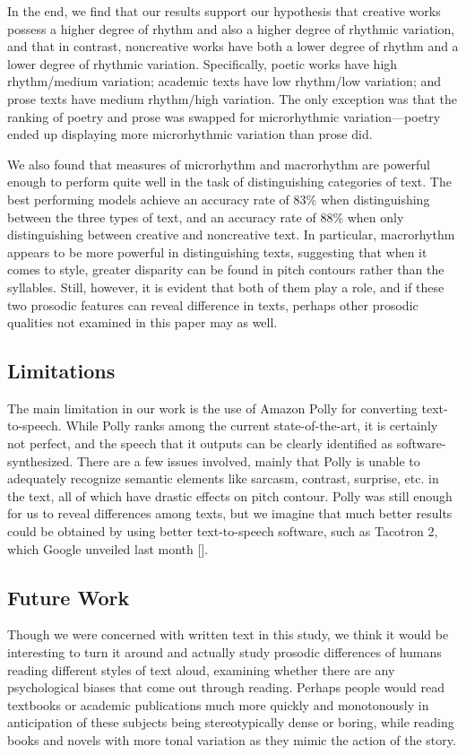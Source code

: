 \documentclass[pageno]{jpaper}
\begin{document}
	In the end, we find that our results support our hypothesis that creative works possess a higher degree of rhythm and also a higher degree of rhythmic variation, and that in contrast, noncreative works have both a lower degree of rhythm and a lower degree of rhythmic variation. Specifically, poetic works have high rhythm/medium variation; academic texts have low rhythm/low variation; and prose texts have medium rhythm/high variation. The only exception was that the ranking of poetry and prose was swapped for microrhythmic variation---poetry ended up displaying more microrhythmic variation than prose did.
	
	We also found that measures of microrhythm and macrorhythm are powerful enough to perform quite well in the task of distinguishing categories of text. The best performing models achieve an accuracy rate of 83\% when distinguishing between the three types of text, and an accuracy rate of 88\% when only distinguishing between creative and noncreative text. In particular, macrorhythm appears to be more powerful in distinguishing texts, suggesting that when it comes to style, greater disparity can be found in pitch contours rather than the syllables. Still, however, it is evident that both of them play a role, and if these two prosodic features can reveal difference in texts, perhaps other prosodic qualities not examined in this paper may as well.
\subsection{Limitations}
The main limitation in our work is the use of Amazon Polly for converting text-to-speech. While Polly ranks among the current state-of-the-art, it is certainly not perfect, and the speech that it outputs can be clearly identified as software-synthesized. There are a few issues involved, mainly that Polly is unable to adequately recognize semantic elements like sarcasm, contrast, surprise, etc. in the text, all of which have drastic effects on pitch contour. Polly was still enough for us to reveal differences among texts, but we imagine that much better results could be obtained by using better text-to-speech software, such as Tacotron 2, which Google unveiled last month [].
\subsection{Future Work}
Though we were concerned with written text in this study, we think it would be interesting to turn it around and actually study prosodic differences of humans reading different styles of text aloud, examining whether there are any psychological biases that come out through reading. Perhaps people would read textbooks or academic publications much more quickly and monotonously in anticipation of these subjects being stereotypically dense or boring, while reading books and novels with more tonal variation as they mimic the action of the story.
\end{document}
